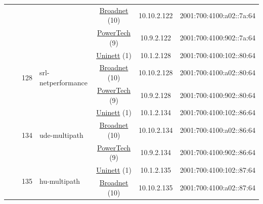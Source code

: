 \begin{small}
\begin{center}
\begin{longtable}{|c|c|c|c|c|c|c|c|}
  &  &  &  & \multicolumn{2}{|c|}{\tiny{\href{https://www.broadnet.no}{Broadnet} (10)}} & \tiny{10.10.2.122} & \tiny{2001:700:4100:a02::7a:64} \\* \cline{5-5}\cline{6-6}\cline{7-7}\cline{8-8}
  &  &  &  & \multicolumn{2}{|c|}{\tiny{\href{http://www.powertech.no}{PowerTech} (9)}} & \tiny{10.9.2.122} & \tiny{2001:700:4100:902::7a:64} \\* \cline{3-3}\cline{4-4}\cline{5-5}\cline{6-6}\cline{7-7}\cline{8-8}
  &  & \multirow{3}{*}{\tiny{128}} & \multicolumn{1}{|l|}{\multirow{3}{*}{\tiny{srl-netperformance}}} & \multicolumn{2}{|c|}{\tiny{\href{https://www.uninett.no}{Uninett} (1)}} & \tiny{10.1.2.128} & \tiny{2001:700:4100:102::80:64} \\* \cline{5-5}\cline{6-6}\cline{7-7}\cline{8-8}
  &  &  &  & \multicolumn{2}{|c|}{\tiny{\href{https://www.broadnet.no}{Broadnet} (10)}} & \tiny{10.10.2.128} & \tiny{2001:700:4100:a02::80:64} \\* \cline{5-5}\cline{6-6}\cline{7-7}\cline{8-8}
  &  &  &  & \multicolumn{2}{|c|}{\tiny{\href{http://www.powertech.no}{PowerTech} (9)}} & \tiny{10.9.2.128} & \tiny{2001:700:4100:902::80:64} \\* \cline{3-3}\cline{4-4}\cline{5-5}\cline{6-6}\cline{7-7}\cline{8-8}
  &  & \multirow{3}{*}{\tiny{134}} & \multicolumn{1}{|l|}{\multirow{3}{*}{\tiny{ude-multipath}}} & \multicolumn{2}{|c|}{\tiny{\href{https://www.uninett.no}{Uninett} (1)}} & \tiny{10.1.2.134} & \tiny{2001:700:4100:102::86:64} \\* \cline{5-5}\cline{6-6}\cline{7-7}\cline{8-8}
  &  &  &  & \multicolumn{2}{|c|}{\tiny{\href{https://www.broadnet.no}{Broadnet} (10)}} & \tiny{10.10.2.134} & \tiny{2001:700:4100:a02::86:64} \\* \cline{5-5}\cline{6-6}\cline{7-7}\cline{8-8}
  &  &  &  & \multicolumn{2}{|c|}{\tiny{\href{http://www.powertech.no}{PowerTech} (9)}} & \tiny{10.9.2.134} & \tiny{2001:700:4100:902::86:64} \\* \cline{3-3}\cline{4-4}\cline{5-5}\cline{6-6}\cline{7-7}\cline{8-8}
  &  & \multirow{3}{*}{\tiny{135}} & \multicolumn{1}{|l|}{\multirow{3}{*}{\tiny{hu-multipath}}} & \multicolumn{2}{|c|}{\tiny{\href{https://www.uninett.no}{Uninett} (1)}} & \tiny{10.1.2.135} & \tiny{2001:700:4100:102::87:64} \\* \cline{5-5}\cline{6-6}\cline{7-7}\cline{8-8}
  &  &  &  & \multicolumn{2}{|c|}{\tiny{\href{https://www.broadnet.no}{Broadnet} (10)}} & \tiny{10.10.2.135} & \tiny{2001:700:4100:a02::87:64} \\* \cline{5-5}\cline{6-6}\cline{7-7}\cline{8-8}

\end{longtable}
\end{center}
\end{small}
